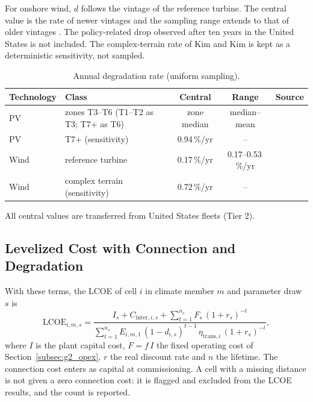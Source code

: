 For onshore wind, $d$ follows the vintage of the reference turbine. The
central value is the rate of newer vintages and the sampling range
extends to that of older vintages \cite{hamilton2020}. The policy-related
drop observed after ten years in the United States is not included. The
complex-terrain rate of Kim and Kim \cite{kim2025} is kept as a
deterministic sensitivity, not sampled.

\begin{table}[htbp]
    \centering
    \caption{Annual degradation rate (uniform sampling).}
    \label{tab:g3_degradation}
    \small
    \begin{tabular}{llccc}
        \toprule
        Technology & Class & Central & Range & Source \\
        \midrule
        PV   & zones T3--T6 (T1--T2 as T3; T7+ as T6) & zone median & median--mean & \cite{jordan2022} \\
        PV   & T7+ (sensitivity) & 0.94\,\%/yr & -- & \cite{straubmuck2025} \\
        Wind & reference turbine & 0.17\,\%/yr & 0.17--0.53\,\%/yr & \cite{hamilton2020} \\
        Wind & complex terrain (sensitivity) & 0.72\,\%/yr & -- & \cite{kim2025} \\
        \bottomrule
    \end{tabular}
\end{table}

All central values are transferred from United States fleets (Tier 2).

\subsection{Levelized Cost with Connection and Degradation}
\label{subsec:g3_lcoe}

With these terms, the LCOE of cell $i$ in climate member $m$ and
parameter draw $s$ is
\begin{equation}
    \mathrm{LCOE}_{i,m,s} =
    \frac{I_s + C_{\mathrm{inter},i,s}
          + \sum_{t=1}^{n_s} F_s\,(1+r_s)^{-t}}
         {\sum_{t=1}^{n_s} E_{i,m,1}\,(1-d_{i,s})^{t-1}\,
          \eta_{\mathrm{trans},i}\,(1+r_s)^{-t}},
    \label{eq:g3_lcoe}
\end{equation}
where $I$ is the plant capital cost, $F=f\,I$ the fixed operating cost
of Section~\ref{subsec:g2_opex}, $r$ the real discount rate and $n$ the
lifetime. The connection cost enters as capital at commissioning. A cell
with a missing distance is not given a zero connection cost: it is
flagged and excluded from the LCOE results, and the count is reported.

